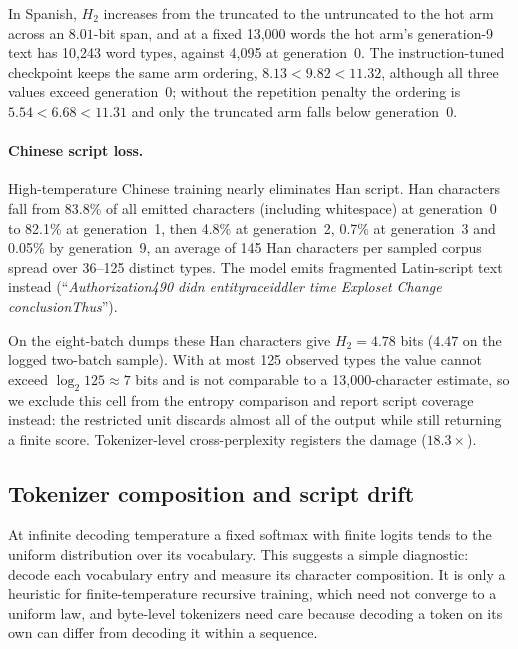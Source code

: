 \documentclass[10pt]{article}
\theoremstyle{plain}
\theoremstyle{definition}
\newcommand{\Htwo}{H_2}
\begin{document}
In Spanish, $\Htwo$ increases from the truncated to the untruncated to the hot arm across an
$8.01$-bit span, and at a fixed 13,000 words the hot arm's generation-9 text has 10,243 word
types, against 4,095 at generation~0. The instruction-tuned checkpoint keeps the same arm ordering,
$8.13<9.82<11.32$, although all three values exceed generation~0; without the repetition penalty
the ordering is $5.54<6.68<11.31$ and only the truncated arm falls below generation~0.

\paragraph{Chinese script loss.} High-temperature Chinese training nearly eliminates Han
script. Han characters fall from 83.8\% of all emitted characters (including whitespace) at generation~0 to 82.1\% at
generation~1, then 4.8\% at generation~2, 0.7\% at generation~3 and 0.05\% by generation~9, an
average of 145 Han characters per sampled corpus spread over 36--125 distinct types. The model
emits fragmented Latin-script text instead (``\emph{Authorization490 didn entityraceiddler time
Exploset Change conclusionThus}'').

On the eight-batch dumps these Han characters give $\Htwo=4.78$ bits ($4.47$ on the logged
two-batch sample). With at most 125 observed types the value cannot exceed $\log_2 125\approx7$
bits and is not comparable to a 13,000-character estimate, so we exclude this cell from the entropy comparison and report script coverage instead: the
restricted unit discards almost all of the output while still returning a finite score.
Tokenizer-level cross-perplexity registers the damage ($18.3\times$).

\subsection{Tokenizer composition and script drift}
\label{sec:vocabdrift}

At infinite decoding temperature a fixed softmax with finite logits tends to the uniform
distribution over its vocabulary. This suggests a simple diagnostic: decode each vocabulary entry
and measure its character composition. It is only a heuristic for finite-temperature recursive
training, which need not converge to a uniform law, and byte-level tokenizers need care because
decoding a token on its own can differ from decoding it within a sequence.
\end{document}
